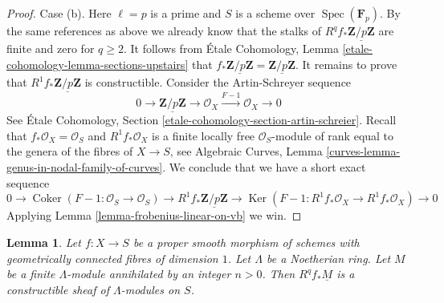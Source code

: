 \documentclass{stacks-project}
\theoremstyle{plain}
\newtheorem{lemma}[subsection]{Lemma}
\theoremstyle{definition}
\theoremstyle{remark}
\numberwithin{equation}{subsection}
\def\Spec{\mathop{\mathrm{Spec}}}
\def\Ker{\mathop{\mathrm{Ker}}}
\def\Coker{\mathop{\mathrm{Coker}}}
\begin{document}
\begin{proof}
\medskip\noindent
Case (b). Here $\ell = p$ is a prime and $S$ is a scheme over
$\Spec(\mathbf{F}_p)$. By the same references as above we already
know that the stalks of $R^qf_*\underline{\mathbf{Z}/p\mathbf{Z}}$
are finite and zero for $q \geq 2$. It follows from
\'Etale Cohomology, Lemma \ref{etale-cohomology-lemma-sections-upstairs}
that $f_*\underline{\mathbf{Z}/p\mathbf{Z}} =
\underline{\mathbf{Z}/p\mathbf{Z}}$. It remains to prove
that $R^1f_*\underline{\mathbf{Z}/p\mathbf{Z}}$ is constructible.
Consider the Artin-Schreyer sequence
$$
0 \to \underline{\mathbf{Z}/p\mathbf{Z}} \to \mathcal{O}_X
\xrightarrow{F - 1} \mathcal{O}_X
\to 0
$$
See \'Etale Cohomology, Section \ref{etale-cohomology-section-artin-schreier}.
Recall that $f_*\mathcal{O}_X = \mathcal{O}_S$ and
$R^1f_*\mathcal{O}_X$ is a finite locally free $\mathcal{O}_S$-module
of rank equal to the genera of the fibres of $X \to S$, see
Algebraic Curves, Lemma \ref{curves-lemma-genus-in-nodal-family-of-curves}.
We conclude that we have a short exact sequence
$$
0 \to
\Coker(F - 1 : \mathcal{O}_S \to \mathcal{O}_S)
\to R^1f_*\underline{\mathbf{Z}/p\mathbf{Z}} \to
\Ker(F - 1 : R^1f_*\mathcal{O}_X \to R^1f_*\mathcal{O}_X)
\to 0
$$
Applying Lemma \ref{lemma-frobenius-linear-on-vb} we win.
\end{proof}

\begin{lemma}
\label{lemma-proper-smooth-family-curves-modules}
Let $f : X \to S$ be a proper smooth morphism of schemes with
geometrically connected fibres of dimension $1$. Let $\Lambda$
be a Noetherian ring. Let $M$ be a finite $\Lambda$-module
annihilated by an integer $n > 0$. Then $R^qf_*\underline{M}$
is a constructible sheaf of $\Lambda$-modules on $S$.
\end{lemma}
\end{document}
